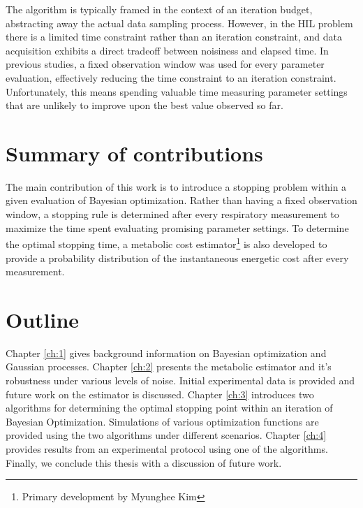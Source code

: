 The algorithm is typically framed in the context of an iteration budget, abstracting away the actual data sampling process. However, in the HIL problem there is a limited time constraint rather than an iteration constraint, and data acquisition exhibits a direct tradeoff between noisiness and elapsed time. In previous studies, a fixed observation window was used for every parameter evaluation, effectively reducing the time constraint to an iteration constraint. Unfortunately, this means spending valuable time measuring parameter settings that are unlikely to improve upon the best value observed so far.

\section*{Summary of contributions}
The main contribution of this work is to introduce a stopping problem within a given evaluation of Bayesian optimization. Rather than having a fixed observation window, a stopping rule is determined after every respiratory measurement to maximize the time spent evaluating promising parameter settings. To determine the optimal stopping time, a metabolic cost estimator\footnote{Primary development by Myunghee Kim} is also developed to provide a probability distribution of the instantaneous energetic cost after every measurement.

\section*{Outline}
Chapter \ref{ch:1} gives background information on Bayesian optimization and Gaussian processes. Chapter \ref{ch:2} presents the metabolic estimator and it's robustness under various levels of noise. Initial experimental data is provided and future work on the estimator is discussed. Chapter \ref{ch:3} introduces two algorithms for determining the optimal stopping point within an iteration of Bayesian Optimization. Simulations of various optimization functions are provided using the two algorithms under different scenarios. Chapter \ref{ch:4} provides results from an experimental protocol using one of the algorithms. Finally, we conclude this thesis with a discussion of future work.